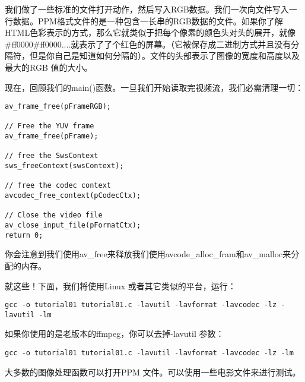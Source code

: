 我们做了一些标准的文件打开动作，然后写入RGB数据。我们一次向文件写入一行数据。PPM格式文件的是一种包含一长串的RGB数据的文件。如果你了解HTML色彩表示的方式，那么它就类似于把每个像素的颜色头对头的展开，就像\#ff0000\#ff0000....就表示了了个红色的屏幕。（它被保存成二进制方式并且没有分隔符，但是你自己是知道如何分隔的）。文件的头部表示了图像的宽度和高度以及最大的RGB 值的大小。

现在，回顾我们的main()函数。一旦我们开始读取完视频流，我们必需清理一切：
\begin{lstlisting}
av_frame_free(pFrameRGB);

// Free the YUV frame
av_frame_free(pFrame);

// free the SwsContext
sws_freeContext(swsContext);

// free the codec context
avcodec_free_context(pCodecCtx);

// Close the video file
av_close_input_file(pFormatCtx);
return 0;
\end{lstlisting}

你会注意到我们使用av_free来释放我们使用avcode_alloc_fram和av_malloc来分配的内存。

就这些！下面，我们将使用Linux 或者其它类似的平台，运行：
\begin{lstlisting}
gcc -o tutorial01 tutorial01.c -lavutil -lavformat -lavcodec -lz -lavutil -lm
\end{lstlisting}

如果你使用的是老版本的ffmpeg，你可以去掉-lavutil 参数：
\begin{lstlisting}
gcc -o tutorial01 tutorial01.c -lavutil -lavformat -lavcodec -lz -lm
\end{lstlisting}

大多数的图像处理函数可以打开PPM 文件。可以使用一些电影文件来进行测试。
